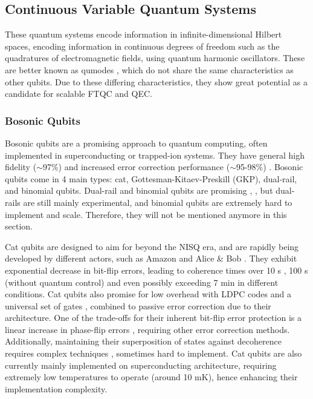 \subsection{Continuous Variable Quantum Systems}
These quantum systems encode information in infinite-dimensional Hilbert spaces, encoding information in continuous degrees of freedom such as the quadratures of electromagnetic fields, using quantum harmonic oscillators. These are better known as qumodes \cite{noauthor_introduction_nodate}, which do not share the same characteristics as other qubits. Due to these differing characteristics, they show great potential as a candidate for scalable FTQC and QEC. 


\subsubsection{Bosonic Qubits}
Bosonic qubits are a promising approach to quantum computing, often implemented in superconducting or trapped-ion systems. They have general high fidelity ($\sim$97\%) and increased error correction performance ($\sim$95-98\%) \cite{chatterjee-2023}. Bosonic qubits come in 4 main types: cat, Gottesman-Kitaev-Preskill (GKP), dual-rail, and binomial qubits. Dual-rail and binomial qubits are promising \cite{levine-2024}, \cite{michael-2016}, but dual-rails are still mainly experimental, and binomial qubits are extremely hard to implement and scale. Therefore, they will not be mentioned anymore in this section.


Cat qubits are designed to aim for beyond the NISQ era, and are rapidly being developed by different actors, such as Amazon \cite{chamberland-2022} and Alice \& Bob \cite{alice-bob-2024}. They exhibit exponential decrease in bit-flip errors, leading to coherence times over 10 s \cite{reglade-2024}, 100 s (without quantum control) \cite{berdou-2023} and even possibly exceeding 7 min \cite{alice-and-bob-2024} in different conditions. Cat qubits also promise for low overhead with LDPC codes and a universal set of gates \cite{ruiz-2024}, combined to passive error correction due to their architecture. One of the trade-offs for their inherent bit-flip error protection is a linear increase in phase-flip errors \cite{quera}, requiring other error correction methods. Additionally, maintaining their superposition of states against decoherence requires complex techniques \cite{tucker-2024}, sometimes hard to implement. Cat qubits are also currently mainly implemented on superconducting architecture, requiring extremely low temperatures to operate (around 10 mK), hence enhancing their implementation complexity.

